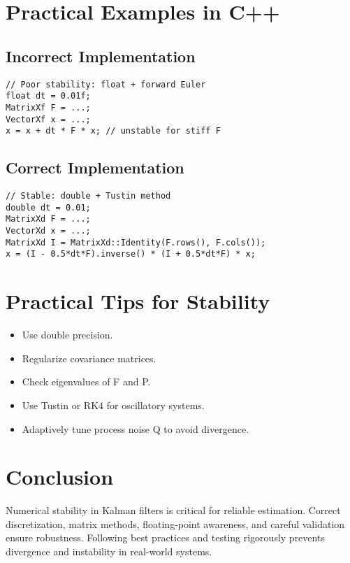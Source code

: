 \documentclass[11pt]{article}
\begin{document}
\section{Practical Examples in C++}
\subsection{Incorrect Implementation}
\begin{lstlisting}
// Poor stability: float + forward Euler
float dt = 0.01f;
MatrixXf F = ...;
VectorXf x = ...;
x = x + dt * F * x; // unstable for stiff F
\end{lstlisting}

\subsection{Correct Implementation}
\begin{lstlisting}
// Stable: double + Tustin method
double dt = 0.01;
MatrixXd F = ...;
VectorXd x = ...;
MatrixXd I = MatrixXd::Identity(F.rows(), F.cols());
x = (I - 0.5*dt*F).inverse() * (I + 0.5*dt*F) * x;
\end{lstlisting}

\section{Practical Tips for Stability}
\begin{itemize}
    \item Use double precision.
    \item Regularize covariance matrices.
    \item Check eigenvalues of F and P.
    \item Use Tustin or RK4 for oscillatory systems.
    \item Adaptively tune process noise Q to avoid divergence.
\end{itemize}

\section{Conclusion}
Numerical stability in Kalman filters is critical for reliable estimation. Correct discretization, matrix methods, floating-point awareness, and careful validation ensure robustness. Following best practices and testing rigorously prevents divergence and instability in real-world systems.
\end{document}

